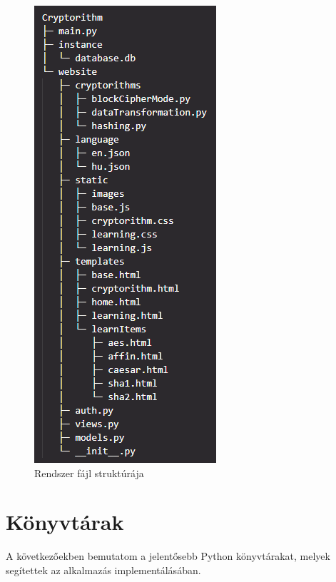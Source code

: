 \begin{figure}[!h]
	\centering
	\includegraphics[scale=0.8]{images/fájlStruktúra}
	\caption{Rendszer fájl struktúrája}
\end{figure}

\section {Könyvtárak}
A következőekben bemutatom a jelentősebb Python könyvtárakat, melyek segítettek az alkalmazás implementálásában.

